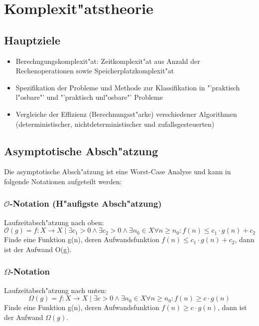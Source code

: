 \section{Komplexit"atstheorie}
\subsection{Hauptziele}
\begin{itemize}
\item Berechngungskomplexit"at: Zeitkomplexit"at aus Anzahl der Rechenoperationen sowie Speicherplatzkomplexit"at
\item Spezifikation der Probleme und Methode zur Klassifikation in "'praktisch l"osbare"' und "'praktisch unl"osbare"' Probleme
\item Vergleiche der Effizienz (Berechnungsst"arke) verschiedener Algorithmen (deterministischer, nichtdeterministischer und zufallsgesteuerten)
\end{itemize}
\subsection{Asymptotische Absch"atzung}
Die asymptotische Absch"atzung ist eine Worst-Case Analyse und kann in folgende Notationen aufgeteilt werden:

\subsubsection{$\mathcal{O}$-Notation (H"aufigste Absch"atzung)}
Laufzeitabsch"atzung nach oben:
\begin{equation}
	\mathcal{O}(g) = {f: X \rightarrow X \mid \exists c_1>0 \wedge \exists c_2>0 \wedge \exists n_0 \in X  \forall n \geq n_0 : f(n) \leq c_1\cdot g(n) + c_2}
\end{equation}
Finde eine Funktion g(n), deren Aufwandsfunktion $f(n) \leq c_1 \cdot g(n) + c_2$, dann ist der Aufwand O(g).

\subsubsection{$\Omega$-Notation}
Laufzeitabsch"atzung nach unten: 
\begin{equation}
\Omega(g) = {f: X \rightarrow X \mid \exists c>0 \wedge \exists n_0 \in X  \forall n \geq n_0 : f(n) \geq c\cdot g(n)}
\end{equation}
Finde eine Funktion g(n), deren Aufwandsfunktion $f(n) \geq c \cdot g(n)$, dann ist der Aufwand $\Omega(g)$.

